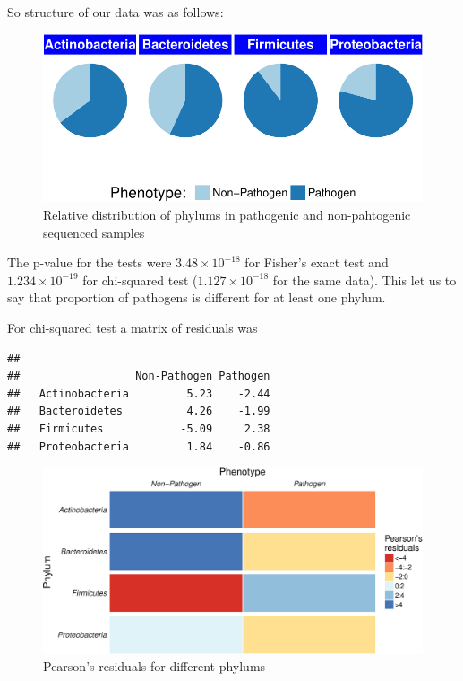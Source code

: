 \documentclass[]{article}
\begin{document}
So structure of our data was as follows:

\begin{figure}[htbp]
\centering
\includegraphics{303_finaltask_files/figure-latex/primary_graphics-1.pdf}
\caption{Relative distribution of phylums in pathogenic and
non-pahtogenic sequenced samples}
\end{figure}

The p-value for the tests were \(3.48\times 10^{-18}\) for Fisher's
exact test and \(1.234\times 10^{-19}\) for chi-squared test
(\(1.127\times 10^{-18}\) for the same data). This let us to say that
proportion of pathogens is different for at least one phylum.

For chi-squared test a matrix of residuals was

\begin{verbatim}
##                 
##                  Non-Pathogen Pathogen
##   Actinobacteria         5.23    -2.44
##   Bacteroidetes          4.26    -1.99
##   Firmicutes            -5.09     2.38
##   Proteobacteria         1.84    -0.86
\end{verbatim}

\begin{figure}[htbp]
\centering
\includegraphics{303_finaltask_files/figure-latex/vizualization2-1.pdf}
\caption{Pearson's residuals for different phylums}
\end{figure}
\end{document}
